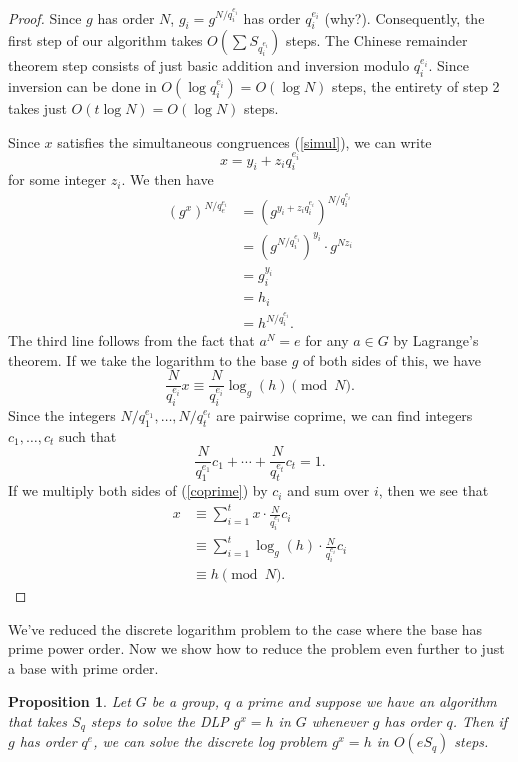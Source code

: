 \documentclass[12pt]{article}
\theoremstyle{plain}
\newtheorem{proposition}[theorem]{Proposition}
\theoremstyle{definition}
\theoremstyle{remark}
\begin{document}
\begin{proof}
    Since $g$ has order $N$, $g_i = g^{N/q_i^{e_i}}$ has order $q_i^{e_i}$ (why?).
    Consequently, the first step of our algorithm takes $O(\sum S_{q_i^{e_i}})$ steps.
    The Chinese remainder theorem step consists of just basic addition and inversion modulo $q_i^{e_i}$.
    Since inversion can be done in $O(\log q_i^{e_i}) = O(\log N)$ steps, the entirety of step 2 takes just $O(t \log N) = O(\log N)$ steps.

    Since $x$ satisfies the simultaneous congruences (\ref{simul}), we can write
    \[
        x = y_i + z_iq_i^{e_i}
    \]
    for some integer $z_i$.
    We then have
    \begin{align*}
        (g^x)^{N/q_e^{e_i}} &= (g^{y_i + z_iq_i^{e_i}})^{N/q_i^{e_i}}\\
        &= (g^{N/q_i^{e_i}})^{y_i}\cdot g^{Nz_i}\\
        &= g_i^{y_i}\\
        &= h_i\\
        &= h^{N/q_i^{e_i}}.
    \end{align*}
    The third line follows from the fact that $a^N = e$ for any $a\in G$ by Lagrange's theorem.
    If we take the logarithm to the base $g$ of both sides of this, we have
    \begin{equation}\label{coprime}
        \frac{N}{q_i^{e_i}}x \equiv \frac{N}{q_i^{e_i}}\log_g(h)\pmod N.
    \end{equation}
    Since the integers $N/q_1^{e_1}, \ldots, N/q_t^{e_t}$ are pairwise coprime, we can find integers $c_1, \ldots, c_t$ such that
    \[
        \frac{N}{q_1^{e_1}}c_1 +\cdots + \frac{N}{q_t^{e_t}}c_t  =1.
    \]
    If we multiply both sides of (\ref{coprime}) by $c_i$ and sum over $i$, then we see that
    \begin{align*}
        x & \equiv  \sum_{i=1}^tx\cdot\frac{N}{q_i^{e_i}}c_i\\
        &\equiv \sum_{i=1}^t\log_g(h)\cdot\frac{N}{q_i^{e_i}}c_i\\
        &\equiv h\pmod N.
    \end{align*}
\end{proof}

We've reduced the discrete logarithm problem to the case where the base has prime power order.
Now we show how to reduce the problem even further to just a base with prime order.

\begin{proposition}
    Let $G$ be a group, $q$ a prime and suppose we have an algorithm that takes $S_q$ steps to solve the DLP $g^x = h$ in $G$ whenever $g$ has order $q$.
    Then if $g$ has order $q^e$, we can solve the discrete log problem $g^x = h$ in $O(eS_q)$ steps.
\end{proposition}
\end{document}
